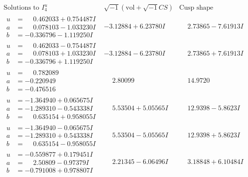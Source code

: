 \documentclass[1p]{elsarticle_modified}
\theoremstyle{definition}
\newcommand{\I}{\sqrt{-1}}
\begin{document}
$$\begin{array}{c|c|c}  
\text{Solutions to }I^u_{4}& \I (\text{vol} + \sqrt{-1}CS) & \text{Cusp shape}\\
 \hline 
\begin{aligned}
u &= \phantom{-}0.462033 + 0.754487 I \\
a &= \phantom{-}0.078103 - 1.033230 I \\
b &= -0.336796 - 1.119250 I\end{aligned}
 & -3.12884 + 6.23780 I & \phantom{-}2.73865 - 7.61913 I \\ \hline\begin{aligned}
u &= \phantom{-}0.462033 - 0.754487 I \\
a &= \phantom{-}0.078103 + 1.033230 I \\
b &= -0.336796 + 1.119250 I\end{aligned}
 & -3.12884 - 6.23780 I & \phantom{-}2.73865 + 7.61913 I \\ \hline\begin{aligned}
u &= \phantom{-}0.782089\phantom{ +0.000000I} \\
a &= -0.220949\phantom{ +0.000000I} \\
b &= -0.476516\phantom{ +0.000000I}\end{aligned}
 & \phantom{-}2.80099\phantom{ +0.000000I} & \phantom{-}14.9720\phantom{ +0.000000I} \\ \hline\begin{aligned}
u &= -1.364940 + 0.065675 I \\
a &= -1.289310 - 0.543338 I \\
b &= \phantom{-}0.635154 + 0.958055 I\end{aligned}
 & \phantom{-}5.53504 + 5.05565 I & \phantom{-}12.9398 - 5.8623 I \\ \hline\begin{aligned}
u &= -1.364940 - 0.065675 I \\
a &= -1.289310 + 0.543338 I \\
b &= \phantom{-}0.635154 - 0.958055 I\end{aligned}
 & \phantom{-}5.53504 - 5.05565 I & \phantom{-}12.9398 + 5.8623 I \\ \hline\begin{aligned}
u &= -0.559877 + 0.179451 I \\
a &= \phantom{-}2.50809 - 0.97379 I \\
b &= -0.791008 + 0.978807 I\end{aligned}
 & \phantom{-}2.21345 - 6.06496 I & \phantom{-}3.18848 + 6.10484 I \\ \hline\begin{aligned}

\end{aligned}
\end{array}$$
\end{document}
